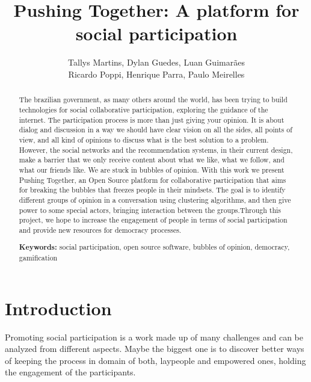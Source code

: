 \documentclass{llncs}
\begin{document}
\sloppy
\title{Pushing Together: A platform for social participation}

\author{Tallys Martins, Dylan Guedes, Luan Guimarães\\
        Ricardo Poppi, Henrique Parra, Paulo Meirelles}

  

\maketitle
\begin{abstract}
  The brazilian government, as many others around the world, has been trying to
build technologies for social collaborative participation, exploring the
guidance of the internet. The participation process is more than just giving
your opinion. It is about dialog and discussion in a way we should have clear
vision on all the sides, all points of view, and all kind of opinions to
discuss what is the best solution to a problem. However, the social networks
and the recommendation systems, in their current design, make a barrier that we
only receive content about what we like, what we follow, and what our friends
like. We are stuck in bubbles of opinion.  With this work we present Pushing
Together, an Open Source platform for collaborative participation that aims for
breaking the bubbles that freezes people in their mindsets. The goal is to
identify different groups of opinion in a conversation using clustering
algorithms, and then give power to some special actors, bringing interaction
between the groups.Through this project, we hope to increase the engagement of
people in terms of social participation and provide new resources for democracy
processes.

\textbf{Keywords:} social participation, open source software, bubbles of
opinion, democracy, gamification
\end{abstract}

\section{Introduction}
\label{sec:intro}
  Promoting social participation is a work made up of many challenges and can
be analyzed from different aspects. Maybe the biggest one is to discover better
ways of keeping the process in domain of both, laypeople and empowered ones,
holding the engagement of the participants.
\end{document}
